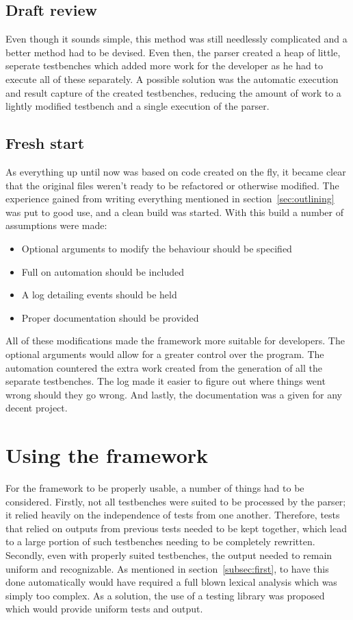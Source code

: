\documentclass[11pt,british]{article}
\begin{document}
\subsection{Draft review}
\label{subsec:review}
Even though it sounds simple, this method was still needlessly complicated and a better method had to be devised. Even then, the parser created a heap of little, seperate testbenches which added more work for the developer as he had to execute all of these separately. A possible solution was the automatic execution and result capture of the created testbenches, reducing the amount of work to a lightly modified testbench and a single execution of the parser.

\subsection{Fresh start}
As everything up until now was based on code created on the fly, it became clear that the original files weren't ready to be refactored or otherwise modified. The experience gained from writing everything mentioned in section~\ref{sec:outlining} was put to good use, and a clean build was started. With this build a number of assumptions were made:
\begin{itemize}
\item Optional arguments to modify the behaviour should be specified
\item Full on automation should be included
\item A log detailing events should be held
\item Proper documentation should be provided
\end{itemize}
All of these modifications made the framework more suitable for developers. The optional arguments would allow for a greater control over the program. The automation countered the extra work created from the generation of all the separate testbenches. The log made it easier to figure out where things went wrong should they go wrong. And lastly, the documentation was a given for any decent project.

\newpage{}
\section{Using the framework}
\label{sec:using}
For the framework to be properly usable, a number of things had to be considered. Firstly, not all testbenches were suited to be processed by the parser; it relied heavily on the independence of tests from one another. Therefore, tests that relied on outputs from previous tests needed to be kept together, which lead to a large portion of such testbenches needing to be completely rewritten.
\\[\baselineskip]
Secondly, even with properly suited testbenches, the output needed to remain uniform and recognizable. As mentioned in section~\ref{subsec:first}, to have this done automatically would have required a full blown lexical analysis which was simply too complex. As a solution, the use of a testing library was proposed which would provide uniform tests and output.
\end{document}
